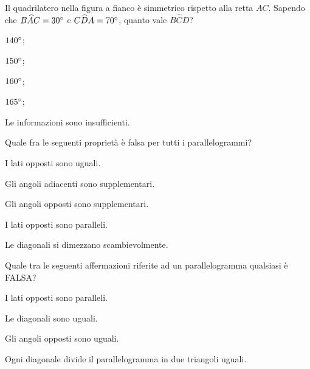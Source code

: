 \noindent\begin{minipage}{0.6\textwidth}\parindent15pt
\begin{esercizio}
\label{ese:4.60}
Il quadrilatero nella figura a fianco è simmetrico rispetto alla retta $AC$.
Sapendo che $B\widehat{A}C = 30{}^{\circ}$ e $C\widehat{D}A = 70{}^{\circ}$, quanto vale $B\widehat{C}D$?
\begin{enumeratea}
\item $140{}^{\circ}$;
\item $150{}^{\circ}$;
\item $160{}^{\circ}$;
\item $165{}^{\circ}$;
\item Le informazioni sono insufficienti.
\end{enumeratea}
\end{esercizio}
\end{minipage}\hfil
\begin{minipage}{0.4\textwidth}
	\centering
\end{minipage}

\begin{esercizio}
\label{ese:4.61}
Quale fra le seguenti proprietà è falsa per tutti i parallelogrammi?
\begin{enumeratea}
\item I lati opposti sono uguali.
\item Gli angoli adiacenti sono supplementari.
\item Gli angoli opposti sono supplementari.
\item I lati opposti sono paralleli.
\item Le diagonali si dimezzano scambievolmente.
\end{enumeratea}
\end{esercizio}

\begin{esercizio}
\label{ese:4.62}
Quale tra le seguenti affermazioni riferite ad un parallelogramma qualsiasi è FALSA?
\begin{enumeratea}
\item I lati opposti sono paralleli.
\item Le diagonali sono uguali.
\item Gli angoli opposti sono uguali.
\item Ogni diagonale divide il parallelogramma in due triangoli uguali.
\end{enumeratea}
\end{esercizio}

